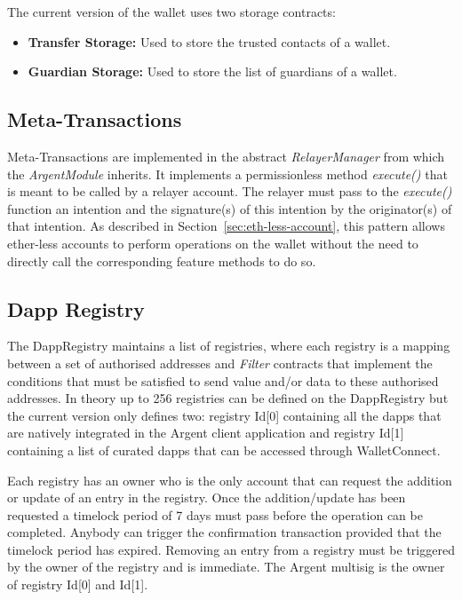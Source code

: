 \documentclass[12pt]{article}
\begin{document}
The current version of the wallet uses two storage contracts:
\begin{itemize}
    \item \textbf{Transfer Storage:} Used to store the trusted contacts of a wallet.
    \item \textbf{Guardian Storage:} Used to store the list of guardians of a wallet.
\end{itemize}

\subsection{Meta-Transactions}
\label{sec:meta-transactions}
Meta-Transactions are implemented in the abstract \emph{RelayerManager} from which the \emph{ArgentModule} inherits. It implements a permissionless method \emph{execute()} that is meant to be called by a relayer account. The relayer must pass to the \emph{execute()} function an intention and the signature(s) of this intention by the originator(s) of that intention. As described in Section~\ref{sec:eth-less-account}, this pattern allows ether-less accounts to perform operations on the wallet without the need to directly call the corresponding feature methods to do so.

\subsection{Dapp Registry}

The DappRegistry maintains a list of registries, where each registry is a mapping between a set of authorised addresses and \emph{Filter} contracts that implement the conditions that must be satisfied to send value and/or data to these authorised addresses. In theory up to 256 registries can be defined on the DappRegistry but the current version only defines two: registry Id[0] containing all the dapps that are natively integrated in the Argent client application and registry Id[1] containing a list of curated dapps that can be accessed through WalletConnect. 

Each registry has an owner who is the only account that can request the addition or update of an entry in the registry. Once the addition/update has been requested a timelock period of 7 days must pass before the operation can be completed. Anybody can trigger the confirmation transaction provided that the timelock period has expired. Removing an entry from a registry must be triggered by the owner of the registry and is immediate. The Argent multisig is the owner of registry Id[0] and Id[1].
\end{document}
